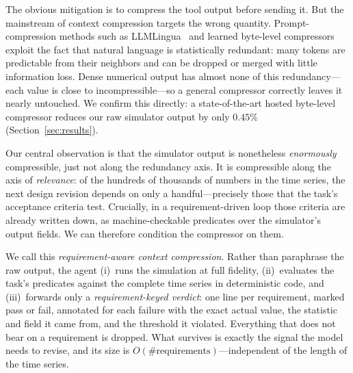 \documentclass[10pt,twocolumn]{article}
\begin{document}
The obvious mitigation is to compress the tool output before sending it. But the
mainstream of context compression targets the wrong quantity. Prompt-compression
methods such as LLMLingua~\cite{jiang2023llmlingua,jiang2024longllmlingua} and
learned byte-level compressors exploit the fact that natural language is
statistically redundant: many tokens are predictable from their neighbors and can
be dropped or merged with little information loss. Dense numerical output has
almost none of this redundancy---each value is close to incompressible---so a
general compressor correctly leaves it nearly untouched. We confirm this directly:
a state-of-the-art hosted byte-level compressor reduces our raw simulator output by
only $0.45\%$ (Section~\ref{sec:results}).

Our central observation is that the simulator output is nonetheless \emph{enormously}
compressible, just not along the redundancy axis. It is compressible along the axis
of \emph{relevance}: of the hundreds of thousands of numbers in the time series,
the next design revision depends on only a handful---precisely those that the task's
acceptance criteria test. Crucially, in a requirement-driven loop those criteria are
already written down, as machine-checkable predicates over the simulator's output
fields. We can therefore condition the compressor on them.

We call this \emph{requirement-aware context compression}. Rather than paraphrase
the raw output, the agent (i)~runs the simulation at full fidelity, (ii)~evaluates
the task's predicates against the complete time series in deterministic code, and
(iii)~forwards only a \emph{requirement-keyed verdict}: one line per requirement,
marked pass or fail, annotated for each failure with the exact actual value, the
statistic and field it came from, and the threshold it violated. Everything that
does not bear on a requirement is dropped. What survives is exactly the signal the
model needs to revise, and its size is $O(\text{\#requirements})$---independent of
the length of the time series.
\end{document}
